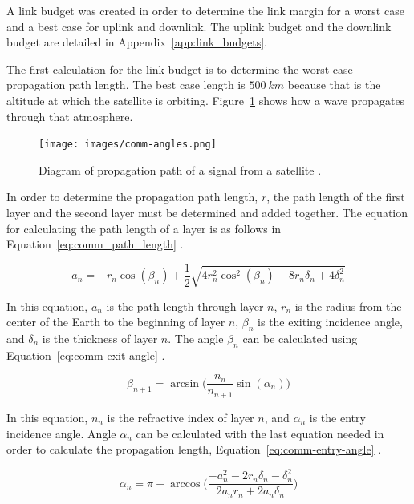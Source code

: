 \documentclass[12pt]{article}
\begin{document}
A link budget was created in order to determine the link margin for a worst case and a best case for uplink and downlink. The uplink budget and the downlink budget are detailed in Appendix~\ref{app:link_budgets}.

The first calculation for the link budget is to determine the worst case propagation path length. The best case length is $500\ km$ because that is the altitude at which the satellite is orbiting. Figure~\ref{fig:comm_propagation_path} shows how a wave propagates through that atmosphere.

\begin{figure}[ht]
\centering
  \texttt{[image: images/comm-angles.png]}
\caption{Diagram of propagation path of a signal from a satellite \cite[p.~12]{ITU-R}.}
\label{fig:comm_propagation_path}
\end{figure}

In order to determine the propagation path length, $r$, the path length of the first layer and the second layer must be determined and added together. The equation for calculating the path length of a layer is as follows in Equation~\ref{eq:comm_path_length} \cite[p.~9]{ITU-R}.

\begin{equation}\label{eq:comm_path_length}
a_n = -r_n\cos(\beta_n) + \frac{1}{2}\sqrt{4r_n^2\cos^2(\beta_n)+8r_n\delta_n+4\delta_n^2} 
\end{equation}

In this equation, $a_n$ is the path length through layer $n$, $r_n$ is the radius from the center of the Earth to the beginning of layer $n$, $\beta_n$ is the exiting incidence angle, and $\delta_n$ is the thickness of layer $n$.
The angle $\beta_n$ can be calculated using Equation~\ref{eq:comm-exit-angle} \cite[p.~10]{ITU-R}.

\begin{equation}\label{eq:comm-exit-angle}
\beta_{n+1} = \arcsin\biggl(\frac{n_n}{n_{n+1}}\sin(\alpha_n)\biggr) 
\end{equation}

In this equation, $n_n$ is the refractive index of layer $n$, and $\alpha_n$ is the entry incidence angle. Angle $\alpha_n$ can be calculated with the last equation needed in order to calculate the propagation length, Equation~\ref{eq:comm-entry-angle} \cite[p.~9]{ITU-R}.

\begin{equation}\label{eq:comm-entry-angle}
\alpha_n = \pi - \arccos \biggl(\frac{-a_n^2 - 2r_n\delta_n - \delta_n^2}{2a_n r_n + 2a_n \delta_n}\biggr) 
\end{equation}
\end{document}
